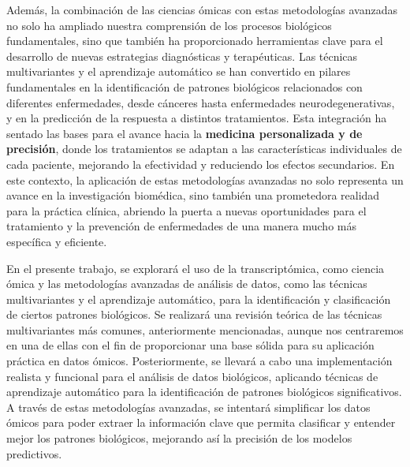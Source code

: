 Además, la combinación de las ciencias ómicas con estas metodologías avanzadas no solo ha ampliado nuestra comprensión
de los procesos biológicos fundamentales, sino que también ha proporcionado herramientas clave para el desarrollo de 
nuevas estrategias diagnósticas y terapéuticas. Las técnicas multivariantes y el aprendizaje 
automático se han convertido en pilares fundamentales en la identificación de patrones biológicos relacionados 
con diferentes enfermedades, desde cánceres hasta enfermedades neurodegenerativas, y en la predicción de la 
respuesta a distintos tratamientos. Esta integración ha sentado las bases para el avance hacia la 
\textbf{medicina personalizada y de precisión}, donde los tratamientos se adaptan a las características 
individuales de cada paciente, mejorando la efectividad y reduciendo los efectos secundarios. En este contexto, 
la aplicación de estas metodologías avanzadas no solo representa un avance en la investigación biomédica, sino 
también una prometedora realidad para la práctica clínica, abriendo la puerta a nuevas oportunidades para el 
tratamiento y la prevención de enfermedades de una manera mucho más específica y eficiente. \newline

En el presente trabajo, se explorará el uso de la transcriptómica, como ciencia ómica y las metodologías avanzadas de análisis de 
datos, como las técnicas multivariantes y el aprendizaje automático, para la identificación y clasificación 
de ciertos patrones biológicos. Se realizará una revisión teórica de las técnicas multivariantes más comunes, 
anteriormente mencionadas, aunque nos centraremos en una de ellas con el fin de proporcionar una base sólida 
para su aplicación práctica en datos ómicos. Posteriormente, se llevará a cabo una implementación realista y 
funcional para el análisis de datos biológicos, aplicando técnicas de aprendizaje automático para la identificación 
de patrones biológicos significativos. A través de estas metodologías avanzadas, se intentará simplificar los datos 
ómicos para poder extraer la información clave que permita clasificar y entender mejor los patrones biológicos, 
mejorando así la precisión de los modelos predictivos.

